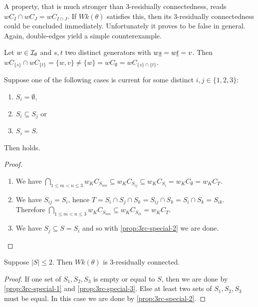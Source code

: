 A property, that is much stronger than 3-residually connectedness, reads $wC_I \cap wC_J = wC_{I \cap J}$. If $Wk(\theta)$ satisfies this, then its 3-residually connectedness could be concluded immediately. Unfortunately it proves to be false in general. Again, double-edges yield a simple counterexample.

\begin{exam}
	Let $w \in \mathcal{I}_{\theta}$ and $s,t$ two distinct generators with $w \underline{s} = w \underline{t} = v$. Then $wC_{\{s\}} \cap wC_{\{t\}} = \{w,v\} \neq \{w\} = wC_{\emptyset} = wC_{\{s\} \cap \{t\}}$.
\end{exam}

\begin{prop}
	Suppose one of the following cases is current for some distinct $i,j \in \{1,2,3\}$:
	\begin{enumerate}
		\item \label{prop:3rc-special-1} $S_i = \emptyset$,
		\item \label{prop:3rc-special-2} $S_i \subseteq S_j$ or
		\item \label{prop:3rc-special-3} $S_i = S$.
	\end{enumerate}
	Then  holds.

	\begin{proof}
		\begin{enumerate}
			\item We have $\bigcap_{1 \leq m < n \leq 3} w_K C_{S_{mn}} \subseteq w_K C_{S_{ij}} \subseteq w_K C_{S_{i}} = w_K C_\emptyset = w_K C_T$.
			\item We have $S_{ij} = S_i$, hence $T = S_i \cap S_j \cap S_k = S_{ij} \cap S_k = S_i \cap S_k = S_{ik}$. Therefore $\bigcap_{1 \leq m < n \leq 3} w_K C_{S_{mn}} \subseteq w_K C_{S_{ik}} = w_K C_T$.
			\item We have $S_j \subseteq S = S_i$ and so with \ref{prop:3rc-special-2} we are done. \qedhere
		\end{enumerate}
	\end{proof}
\end{prop}

\begin{coro}
	Suppose $|S| \leq 2$. Then $Wk(\theta)$ is 3-residually connected.

	\begin{proof}
		If one set of $S_1,S_2,S_3$ is empty or equal to $S$, then we are done by \ref{prop:3rc-special-1} and \ref{prop:3rc-special-3}. Else at least two sets of $S_1,S_2,S_3$ must be equal. In this case we are done by \ref{prop:3rc-special-2}.
	\end{proof}
\end{coro}

